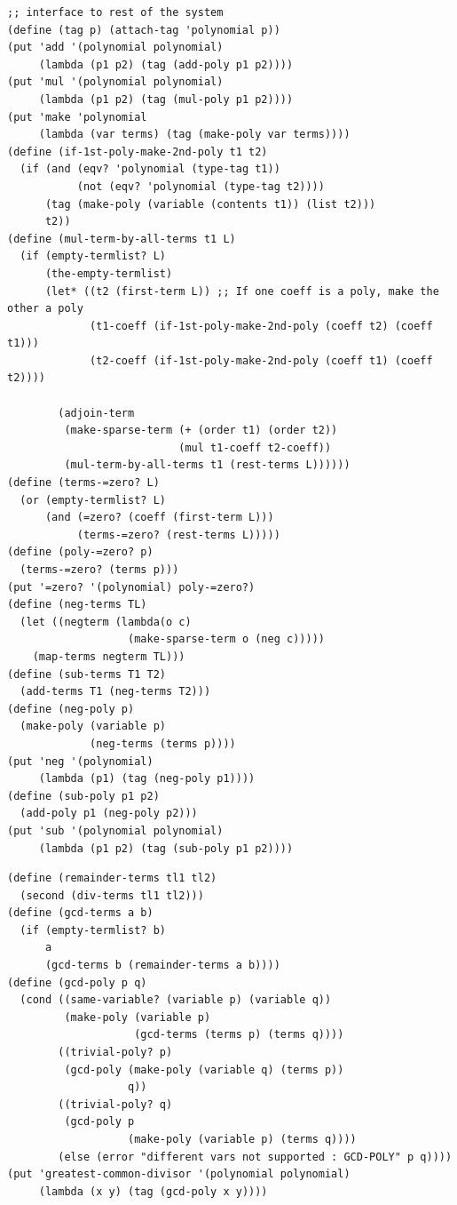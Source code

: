 \documentclass[final,fleqn,titlepage,twoside]{article}
\begin{document}
\begin{verbatim}
;; interface to rest of the system
(define (tag p) (attach-tag 'polynomial p))
(put 'add '(polynomial polynomial)
     (lambda (p1 p2) (tag (add-poly p1 p2))))
(put 'mul '(polynomial polynomial)
     (lambda (p1 p2) (tag (mul-poly p1 p2))))
(put 'make 'polynomial
     (lambda (var terms) (tag (make-poly var terms))))
(define (if-1st-poly-make-2nd-poly t1 t2)
  (if (and (eqv? 'polynomial (type-tag t1))
           (not (eqv? 'polynomial (type-tag t2))))
      (tag (make-poly (variable (contents t1)) (list t2)))
      t2))
(define (mul-term-by-all-terms t1 L)
  (if (empty-termlist? L)
      (the-empty-termlist)
      (let* ((t2 (first-term L)) ;; If one coeff is a poly, make the other a poly
             (t1-coeff (if-1st-poly-make-2nd-poly (coeff t2) (coeff t1)))
             (t2-coeff (if-1st-poly-make-2nd-poly (coeff t1) (coeff t2))))
        
        (adjoin-term
         (make-sparse-term (+ (order t1) (order t2))
                           (mul t1-coeff t2-coeff))
         (mul-term-by-all-terms t1 (rest-terms L))))))
(define (terms-=zero? L)
  (or (empty-termlist? L)
      (and (=zero? (coeff (first-term L)))
           (terms-=zero? (rest-terms L)))))
(define (poly-=zero? p)
  (terms-=zero? (terms p)))
(put '=zero? '(polynomial) poly-=zero?)
(define (neg-terms TL)
  (let ((negterm (lambda(o c)
                   (make-sparse-term o (neg c)))))
    (map-terms negterm TL)))
(define (sub-terms T1 T2)
  (add-terms T1 (neg-terms T2)))
(define (neg-poly p)
  (make-poly (variable p)
             (neg-terms (terms p))))
(put 'neg '(polynomial)
     (lambda (p1) (tag (neg-poly p1))))
(define (sub-poly p1 p2)
  (add-poly p1 (neg-poly p2)))
(put 'sub '(polynomial polynomial)
     (lambda (p1 p2) (tag (sub-poly p1 p2))))
\end{verbatim}
\begin{verbatim}
(define (remainder-terms tl1 tl2)
  (second (div-terms tl1 tl2)))
(define (gcd-terms a b)
  (if (empty-termlist? b)
      a
      (gcd-terms b (remainder-terms a b))))
(define (gcd-poly p q)
  (cond ((same-variable? (variable p) (variable q))
         (make-poly (variable p)
                    (gcd-terms (terms p) (terms q))))
        ((trivial-poly? p)
         (gcd-poly (make-poly (variable q) (terms p))
                   q))
        ((trivial-poly? q)
         (gcd-poly p
                   (make-poly (variable p) (terms q))))
        (else (error "different vars not supported : GCD-POLY" p q))))
(put 'greatest-common-divisor '(polynomial polynomial)
     (lambda (x y) (tag (gcd-poly x y))))
\end{verbatim}
\end{document}
